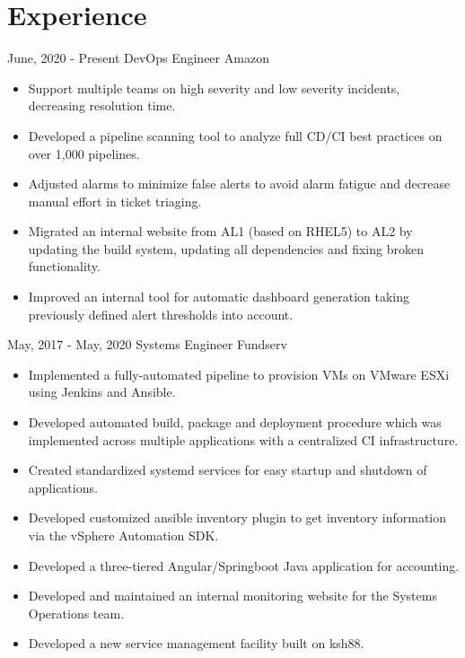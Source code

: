 \documentclass[]{friggeri-cv}
\begin{document}
\section{Experience}
\begin{entrylist}
  \entry
    {June, 2020 - Present}
    {DevOps Engineer}
    {Amazon}
    {\begin{itemize}
        \item Support multiple teams on high severity and low severity incidents, decreasing resolution time.
        \item Developed a pipeline scanning tool to analyze full CD/CI best practices on over 1,000 pipelines.
        \item Adjusted alarms to minimize false alerts to avoid alarm fatigue and decrease manual effort in ticket triaging.
        \item Migrated an internal website from AL1 (based on RHEL5) to AL2 by updating the build system, updating all dependencies and fixing broken functionality.
        \item Improved an internal tool for automatic dashboard generation taking previously defined alert thresholds into account.
    \end{itemize}}
  \entry
    {May, 2017 - May, 2020}
    {Systems Engineer}
    {Fundserv}
    {\begin{itemize}
        \item Implemented a fully-automated pipeline to provision VMs on VMware ESXi\\using Jenkins and Ansible.
        \item Developed automated build, package and deployment procedure which was implemented across multiple applications with a centralized CI infrastructure.
        \item Created standardized systemd services for easy startup and shutdown of\\applications.
        \item Developed customized ansible inventory plugin to get inventory information via the vSphere Automation SDK.
        \item Developed a three-tiered Angular/Springboot Java application for accounting.
        \item Developed and maintained an internal monitoring website for the Systems\\Operations team.
        \item Developed a new service management facility built on ksh88.
    \end{itemize}}
\end{entrylist}
\end{document}
